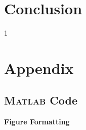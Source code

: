 \documentclass{article}
\begin{document}
\newpage

\section{Conclusion}


\newpage
{}
\setcounter{page}1



\newpage
\section{Appendix}
\subsection{\textsc{Matlab} Code}

\noindent\textbf{Figure Formatting}


\end{document}
